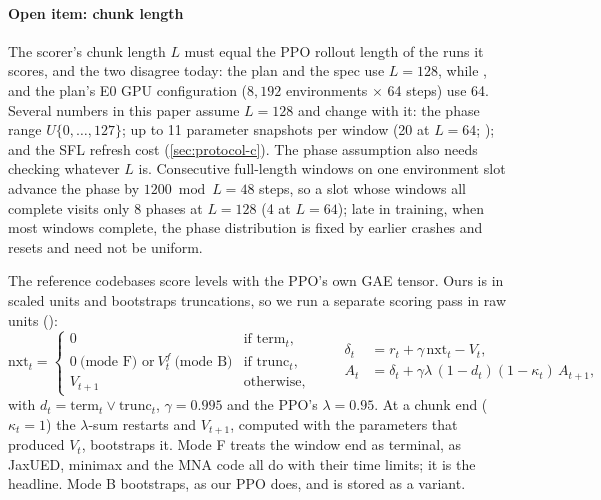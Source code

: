 \paragraph{Open item: chunk length} The scorer's chunk length $L$ must equal the PPO
rollout length of the runs it scores, and the two disagree today: the plan and the spec
use $L = 128$, while ,  and the plan's E0
GPU configuration ($8{,}192$ environments $\times$ 64 steps) use 64. Several numbers in
this paper assume $L = 128$ and change with it: the phase range $U\{0,\dots,127\}$; up to
11 parameter snapshots per window (20 at $L = 64$; ); and the SFL refresh cost
(\cref{sec:protocol-c}). The phase assumption also needs checking whatever $L$ is.
Consecutive full-length windows on one environment slot advance the phase by
$1200 \bmod L = 48$ steps, so a slot whose windows all complete visits only 8 phases at
$L = 128$ (4 at $L = 64$); late in training, when most windows complete, the phase
distribution is fixed by earlier crashes and resets and need not be uniform.

The reference codebases score levels with the PPO's own GAE tensor. Ours is in scaled
units and bootstraps truncations, so we run a separate scoring pass in raw units
():
\begin{equation}
  \mathrm{nxt}_t =
  \begin{cases}
    0 & \text{if } \mathrm{term}_t,\\
    0 \ \text{(mode F) or}\ V^f_t \ \text{(mode B)} & \text{if } \mathrm{trunc}_t,\\
    V_{t+1} & \text{otherwise},
  \end{cases}
  \qquad
  \begin{aligned}
  \delta_t &= r_t + \gamma\,\mathrm{nxt}_t - V_t,\\
  A_t &= \delta_t + \gamma\lambda\,(1-d_t)(1-\kappa_t)\,A_{t+1},
  \end{aligned}
  \label{eq:gae}
\end{equation}
with $d_t = \mathrm{term}_t \lor \mathrm{trunc}_t$, $\gamma = 0.995$ and the PPO's
$\lambda = 0.95$. At a chunk end ($\kappa_t = 1$) the $\lambda$-sum restarts and $V_{t+1}$,
computed with the parameters that produced $V_t$, bootstraps it.
Mode F treats the window end as terminal, as JaxUED, minimax and the MNA code all do with
their time limits; it is the headline. Mode B bootstraps, as our PPO does, and is stored
as a variant.

